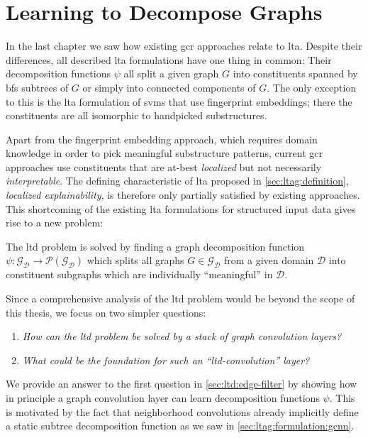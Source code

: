 \chapter{Learning to Decompose Graphs}%
\label{sec:ltd}

In the last chapter we saw how existing \ac{gcr} approaches relate to \ac{lta}.
Despite their differences, all described \ac{lta} formulations have one thing in common:
Their decomposition functions $\psi$ all split a given graph $G$ into constituents spanned by \ac{bfs} subtrees of $G$ or simply into connected components of $G$.
The only exception to this is the \ac{lta} formulation of \acp{svm} that use fingerprint embeddings; there the constituents are all isomorphic to handpicked substructures.

Apart from the fingerprint embedding approach, which requires domain knowledge in order to pick meaningful substructure patterns, current \ac{gcr} approaches use constituents that are at-best \textit{localized} but not necessarily \textit{interpretable}.
The defining characteristic of \ac{lta} proposed in \cref{sec:ltag:definition}, \textit{localized explainability}, is therefore only partially satisfied by existing approaches.
This shortcoming of the existing \ac{lta} formulations for structured input data gives rise to a new problem:
\begin{defn}
	The \ac{ltd} problem is solved by finding a graph decomposition function $\psi: \mathcal{G}_{\mathcal{D}} \to \mathcal{P}(\mathcal{G}_{\mathcal{D}})$ which splits all graphs $G \in \mathcal{G}_{\mathcal{D}}$ from a given domain $\mathcal{D}$ into constituent subgraphs which are individually ``meaningful'' in $\mathcal{D}$.
\end{defn}

Since a comprehensive analysis of the \ac{ltd} problem would be beyond the scope of this thesis, we focus on two simpler questions:
\begin{enumerate}
	\item \textit{How can the \ac{ltd} problem be solved by a stack of graph convolution layers?}
	\item \textit{What could be the foundation for such an ``\acs{ltd}-convolution'' layer?}
\end{enumerate}

We provide an answer to the first question in \cref{sec:ltd:edge-filter} by showing how in principle a graph convolution layer can learn decomposition functions $\psi$.
This is motivated by the fact that neighborhood convolutions already implicitly define a static subtree decomposition function as we saw in \cref{sec:ltag:formulation:gcnn}.

